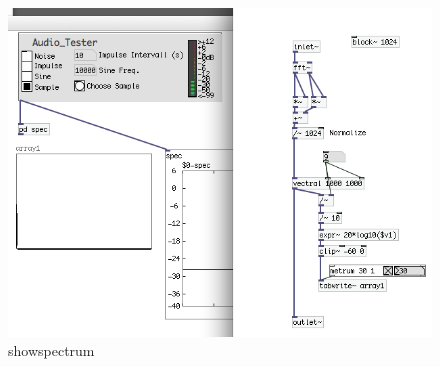 \begin{figure}[h]
	\begin{center}
		\includegraphics[width = 14cm]{img/showspectrum.png}
		\caption{showspectrum}
		\label{fig:showspectrum}
	\end{center}
\end{figure}
